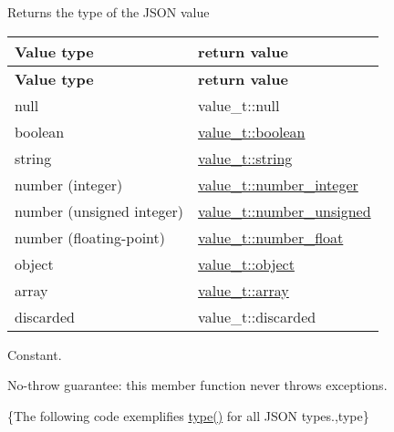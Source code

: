 \begin{DoxyReturn}{Returns}
the type of the J\+S\+ON value \tabulinesep=1mm
\begin{longtabu} spread 0pt [c]{*{2}{|X[-1]}|}
\hline
\rowcolor{\tableheadbgcolor}\textbf{ Value type }&\textbf{ return value  }\\
\endfirsthead
\hline
\endfoot
\hline
\rowcolor{\tableheadbgcolor}\textbf{ Value type }&\textbf{ return value  }\\
\endhead
null &value\+\_\+t\+::null \\
boolean &\hyperlink{namespacenlohmann_1_1detail_a1ed8fc6239da25abcaf681d30ace4985a84e2c64f38f78ba3ea5c905ab5a2da27}{value\+\_\+t\+::boolean} \\
string &\hyperlink{namespacenlohmann_1_1detail_a1ed8fc6239da25abcaf681d30ace4985ab45cffe084dd3d20d928bee85e7b0f21}{value\+\_\+t\+::string} \\
number (integer) &\hyperlink{namespacenlohmann_1_1detail_a1ed8fc6239da25abcaf681d30ace4985a5763da164f8659d94a56e29df64b4bcc}{value\+\_\+t\+::number\+\_\+integer} \\
number (unsigned integer) &\hyperlink{namespacenlohmann_1_1detail_a1ed8fc6239da25abcaf681d30ace4985adce7cc8ec29055c4158828921f2f265e}{value\+\_\+t\+::number\+\_\+unsigned} \\
number (floating-\/point) &\hyperlink{namespacenlohmann_1_1detail_a1ed8fc6239da25abcaf681d30ace4985ad9966ecb59667235a57b4b999a649eef}{value\+\_\+t\+::number\+\_\+float} \\
object &\hyperlink{namespacenlohmann_1_1detail_a1ed8fc6239da25abcaf681d30ace4985aa8cfde6331bd59eb2ac96f8911c4b666}{value\+\_\+t\+::object} \\
array &\hyperlink{namespacenlohmann_1_1detail_a1ed8fc6239da25abcaf681d30ace4985af1f713c9e000f5d3f280adbd124df4f5}{value\+\_\+t\+::array} \\
discarded &value\+\_\+t\+::discarded \\
\end{longtabu}
Constant.
\end{DoxyReturn}
No-\/throw guarantee\+: this member function never throws exceptions.

\{The following code exemplifies {\ttfamily \hyperlink{classnlohmann_1_1basic__json_a2b2d781d7f2a4ee41bc0016e931cadf7}{type()}} for all J\+S\+ON types.,type\}

